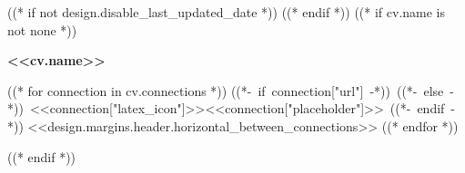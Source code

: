 ((* if not design.disable_last_updated_date *))
\placelastupdatedtext
((* endif *))
((* if cv.name is not none *))
\begin{header}
    \fontsize{<<design.header_font_size>>}{<<design.header_font_size>>}
    \textbf{<<cv.name>>}

    \vspace{<<design.margins.header.vertical_between_name_and_connections>>}

    \normalsize
    ((* for connection in cv.connections *))
    \mbox{((*- if connection["url"] -*))
        ((*- else -*))
        {\footnotesize<<connection["latex_icon"]>>}\hspace*{0.13cm}<<connection["placeholder"]>>
        ((*- endif -*))}
    \kern <<design.margins.header.horizontal_between_connections>>
    ((* endfor *))
\end{header}

\vspace{<<design.margins.header.bottom>> - <<design.margins.section_title.top>>}
((* endif *))